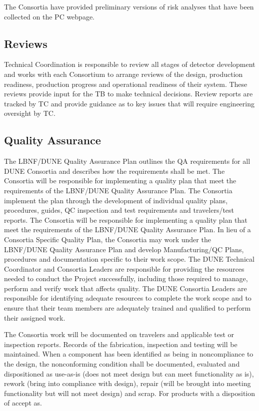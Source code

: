 The Consortia have provided preliminary versions of risk analyses that
have been collected on the PC webpage.

\subsection{Reviews}
\label{sec:fdsp-coord-reviews}

Technical Coordination is responsible to review all stages of detector
development and works with each Consortium to arrange reviews of the
design, production readiness, production progress and operational
readiness of their system.  These reviews provide input for the TB to
make technical decisions.  Review reports are tracked by TC and
provide guidance as to key issues that will require engineering
oversight by TC.

\subsection{Quality Assurance}
\label{sec:fdsp-coord-qa}


The LBNF/DUNE Quality Assurance Plan outlines the QA requirements for
all DUNE Consortia and describes how the requirements shall be
met. The Consortia will be responsible for implementing a quality plan
that meet the requirements of the LBNF/DUNE Quality Assurance Plan.
The Consortia implement the plan through the development of individual
quality plans, procedures, guides, QC inspection and test requirements
and travelers/test reports.  The Consortia will be responsible for
implementing a quality plan that meet the requirements of the
LBNF/DUNE Quality Assurance Plan. In lieu of a Consortia Specific
Quality Plan, the Consortia may work under the LBNF/DUNE Quality
Assurance Plan and develop Manufacturing/QC Plans, procedures and
documentation specific to their work scope.  The DUNE Technical
Coordinator and Consortia Leaders are responsible for providing the
resources needed to conduct the Project successfully, including those
required to manage, perform and verify work that affects quality.  The
DUNE Consortia Leaders are responsible for identifying adequate
resources to complete the work scope and to ensure that their team
members are adequately trained and qualified to perform their assigned
work.

The Consortia work will be documented on travelers and applicable test
or inspection reports. Records of the fabrication, inspection and
testing will be maintained. When a component has been identified as
being in noncompliance to the design, the nonconforming condition
shall be documented, evaluated and dispositioned as use-as-is (does
not meet design but can meet functionality as is), rework (bring into
compliance with design), repair (will be brought into meeting
functionality but will not meet design) and scrap. For products with a
disposition of accept as.

